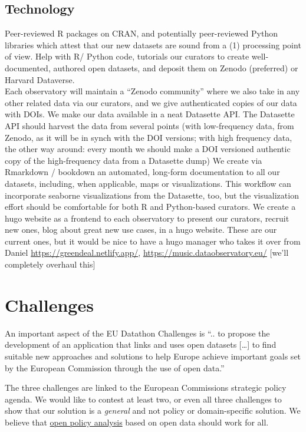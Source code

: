 \documentclass[
  a4paper,
  openany, a4paper, oneside]{book}
\begin{document}
\hypertarget{technology}{%
\section{Technology}\label{technology}}

Peer-reviewed R packages on CRAN, and potentially peer-reviewed Python libraries which attest that our new datasets are sound from a (1) processing point of view.
Help with R/ Python code, tutorials our curators to create well-documented, authored open datasets, and deposit them on Zenodo (preferred) or Harvard Dataverse.\\
Each observatory will maintain a ``Zenodo community'' where we also take in any other related data via our curators, and we give authenticated copies of our data with DOIs.
We make our data available in a neat Datasette API. The Datasette API should harvest the data from several points (with low-frequency data, from Zenodo, as it will be in synch with the DOI versions; with high frequency data, the other way around: every month we should make a DOI versioned authentic copy of the high-frequency data from a Datasette dump)
We create via Rmarkdown / bookdown an automated, long-form documentation to all our datasets, including, when applicable, maps or visualizations.
This workflow can incorporate seaborne visualizations from the Datasette, too, but the visualization effort should be comfortable for both R and Python-based curators.
We create a hugo website as a frontend to each observatory to present our curators, recruit new ones, blog about great new use cases, in a hugo website. These are our current ones, but it would be nice to have a hugo manager who takes it over from Daniel \url{https://greendeal.netlify.app/}, \url{https://music.dataobservatory.eu/} {[}we'll completely overhaul this{]}

\hypertarget{challenges}{%
\chapter{Challenges}\label{challenges}}

An important aspect of the EU Datathon Challenges is ``.. to propose the development of an application that links and uses open datasets {[}\ldots{]} to find suitable new approaches and solutions to help Europe achieve important goals set by the European Commission through the use of open data.''

The three challenges are linked to the European Commissions strategic policy agenda. We would like to contest at least two, or even all three challenges to show that our solution is a \emph{general} and not policy or domain-specific solution. We believe that \href{https://www.bitss.org/opa/\#:~:text=BITSS\%20supports\%20Open\%20Policy\%20Analysis,collaboration\%2C\%20discussion\%2C\%20and\%20reuse.}{open policy analysis} based on open data should work for all.
\end{document}
